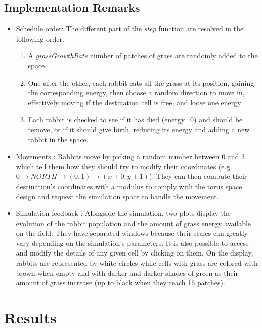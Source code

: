 \documentclass[11pt]{article}
\begin{document}
\subsection{Implementation Remarks}

\begin{itemize}


\item Schedule order: The different part of the \textit{step} function are resolved in the following order.
\begin{enumerate}
\item A \textit{grassGrowthRate} number of patches of grass are randomly added to the space.
\item One after the other, each rabbit eats all the grass at its position, gaining the corresponding energy, then choose a random direction to move in, effectively moving if the destination cell is free, and loose one energy
\item Each rabbit is checked to see if it has died (energy=0) and should be remove, or if it should give birth, reducing its energy and adding a new rabbit in the space.     
\end{enumerate}


\item Movements : Rabbits move by picking a random number between 0 and 3 which tell them how they should try to modify their coordinates (e.g. $0\longrightarrow NORTH \longrightarrow (0,1) \longrightarrow (x+0,y+1)$). They can then compute their destination's coordinates with a modulus to comply with the torus space design and request the simulation space to handle the movement.

\item Simulation feedback : Alongside the simulation, two plots display the evolution of the rabbit population and the amount of grass energy available on the field. They have separated windows because their scales can greatly vary depending on the simulation's parameters. It is also possible to access and modify the details of any given cell by clicking on them. On the display, rabbits are represented by white circles while cells with grass are colored with brown when empty and with darker and darker shades of green as their amount of grass increase (up to black when they reach 16 patches).

\end{itemize}

\section{Results}
\end{document}
